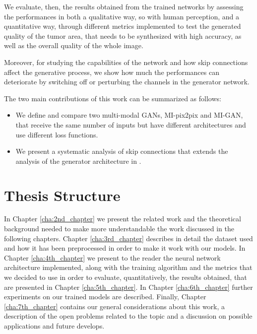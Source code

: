 We evaluate, then, the results obtained from the trained networks by assessing the performances in both a qualitative way, so with human perception, and a quantitative way, through different metrics implemented to test the generated quality of the tumor area, that needs to be synthesized with high accuracy, as well as the overall quality of the whole image. 

Moreover, for studying the capabilities of the network and how skip connections affect the generative process, we show how much the performances can deteriorate by switching off or perturbing the channels in the generator network.  

The two main contributions of this work can be summarized as follows:

\begin{itemize}
\item We define and compare two multi-modal \ac{GAN}s, MI-pix2pix and MI-GAN, that receive the same number of inputs but have different architectures and use different loss functions.
\item We present a systematic analysis of skip connections that extends the analysis of the generator architecture in \cite{pix2pix}.
\end{itemize}


\vspace{5mm} %


\section{Thesis Structure}
\label{sec:third_section}
In Chapter \ref{cha:2nd_chapter} we present the related work and the theoretical background needed to make more understandable the work discussed in the following chapters. Chapter \ref{cha:3rd_chapter} describes in detail the dataset used and how it has been preprocessed in order to make it work with our models.
In Chapter \ref{cha:4th_chapter} we present to the reader the neural network architecture implemented, along with the training algorithm and the metrics that we decided to use in order to evaluate, quantitatively, the results obtained, that are presented in Chapter \ref{cha:5th_chapter}. In Chapter \ref{cha:6th_chapter} further experiments on our trained models are described. Finally, Chapter \ref{cha:7th_chapter} contains our general considerations about this work, a description of the open problems related to the topic and a discussion on possible applications and future develops.